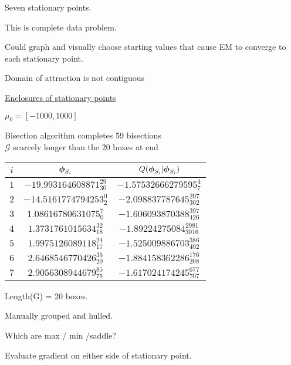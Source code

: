 \documentclass{slides}
\begin{document}
\begin{note}
Seven stationary points.  

This is complete data problem.  

Could graph and visually choose starting values that
cause EM to converge to each stationary point.

Domain of attraction is not contiguous
\end{note}
\begin{slide}
\begin{center}
\underline{Enclosures of stationary points}
\end{center}
$\mu_0 = [-1000,1000]$

Bisection algorithm completes 59 bisections\\
$\mathcal{G}$ scarcely longer than the 20 boxes at end
\renewcommand{\arraystretch}{1.65}
\begin{center}
\begin{tabular}{c|c|c}
$i$ & $\mbox{\boldmath $\phi$}_{S_i}$ & $Q(\mbox{\boldmath $\phi$}_{S_i}|\mbox{\boldmath $\phi$}_{S_i})$ \\ \hline
$1$ & $ -19.993164608871_{30}^{29} $  & $ -1.57532666279595_{7}^{4} $ \\
$2$ & $ -14.5161774794253_{2}^{0} $  & $ -2.098837787645_{302}^{297} $ \\
$3$ & $ 1.08616780631075_{0}^{7} $  & $ -1.606093870388_{426}^{397} $ \\
$4$ & $ 1.3731761015634_{18}^{32} $  & $ -1.89224275084_{3016}^{2981} $ \\
$5$ & $ 1.9975126089118_{17}^{24} $  & $ -1.525009886703_{402}^{386} $ \\
$6$ & $ 2.6468546770426_{20}^{35} $  & $ -1.884158362286_{208}^{176} $ \\
$7$ & $ 2.9056308944679_{75}^{85} $  & $ -1.617024174245_{707}^{677} $ \\
\end{tabular}
\end{center}
\renewcommand{\arraystretch}{1.00}
\end{slide}
\begin{note}

Length(G) = 20 boxes.  

Manually grouped and hulled.

Which are max / min /saddle?

Evaluate gradient on either side of stationary point.

\end{note}
\end{document}
